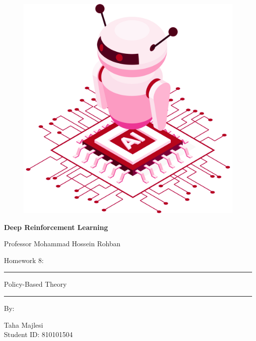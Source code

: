 \documentclass[12pt]{article}
\begin{document}
\thispagestyle{plain}

\begin{center}

\vspace*{-1.5cm}
\begin{figure}[!h]
    \centering
    \includegraphics[width=0.7\linewidth]{figs/cover-std.png}
\end{figure}

{

{\color{DarkBlue} {\fontsize{30}{50} \textbf{
Deep Reinforcement Learning
}}}

{\color{DarkBlue} {\Large
Professor Mohammad Hossein Rohban
}}
}


\vspace{20pt}

{


{\color{RedOrange}
{\Large
Homework 8:
}\\
}
{\color{BrickRed}
\rule{12cm}{0.5pt}

{\Huge
Policy-Based Theory
}
\rule{12cm}{0.5pt}
}

\vspace{10pt}

{\color{RoyalPurple} { \small By:} } \\
\vspace{10pt}

{\color{Blue} { \LARGE Taha Majlesi } } \\
\vspace{5pt}
{\color{RoyalBlue} { \Large Student ID: 810101504 } }


}
\end{center}
\end{document}
